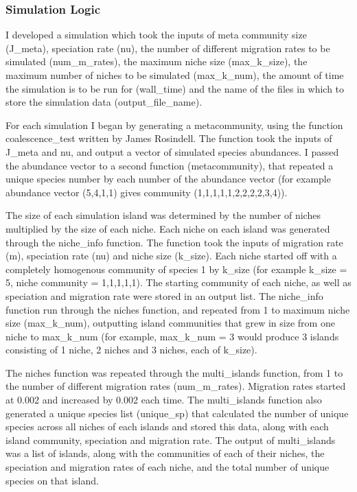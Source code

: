 \documentclass{article}
\begin{document}
\subsubsection{Simulation Logic}
I developed a simulation which took the inputs of meta community size (J\_meta), speciation rate (nu), the number of different migration rates to be simulated (num\_m\_rates), the maximum niche size (max\_k\_size), the maximum number of niches to be simulated (max\_k\_num), the amount of time the simulation is to be run for (wall\_time) and the name of the files in which to store the simulation data (output\_file\_name).\bigskip

For each simulation I began by generating a metacommunity, using the function coalescence\_test written by James Rosindell. The function took the inputs of J\_meta and nu, and output a vector of simulated species abundances. I passed the abundance vector to a second function (metacommunity), that repeated a unique species number by each number of the abundance vector (for example abundance vector (5,4,1,1) gives community (1,1,1,1,1,2,2,2,2,3,4)). \bigskip

The size of each simulation island was determined by the number of niches multiplied by the size of each niche. Each niche on each island was generated through the niche\_info function. The function took the inputs of migration rate (m), speciation rate (nu) and niche size (k\_size). Each niche started off with a completely homogenous community of species 1 by k\_size (for example k\_size = 5, niche community = 1,1,1,1,1). The starting community of each niche, as well as speciation and migration rate were stored in an output list. The niche\_info function run through the niches function, and repeated from 1 to maximum niche size (max\_k\_num), outputting island communities that grew in size from one niche to max\_k\_num (for example, max\_k\_num = 3 would produce 3 islands consisting of 1 niche, 2 niches and 3 niches, each of k\_size). \bigskip

The niches function was repeated through the multi\_islands function, from 1 to the number of different migration rates (num\_m\_rates). Migration rates started at 0.002 and increased by 0.002 each time. The multi\_islands function also generated a unique species list (unique\_sp) that calculated the number of unique species across all niches of each islands and stored this data, along with each island community, speciation and migration rate. The output of multi\_islands was a list of islands, along with the communities of each of their niches, the speciation and migration rates of each niche, and the total number of unique species on that island. \bigskip
 
\end{document}
